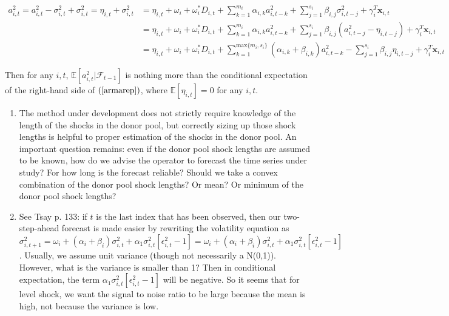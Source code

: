 \documentclass[11pt]{article}
\newcommand{\x}{\textbf{x}}
\def\E{\mathbb{E}} %
\theoremstyle{definition}
\begin{document}
\begin{align}
a^{2}_{i,t} = a^{2}_{i,t} - \sigma^{2}_{i,t} + \sigma^{2}_{i,t} = \eta_{i,t} + \sigma^{2}_{i,t} &= \eta_{i,t} + \omega_{i} + \omega^{*}_i D_{i,t}  + \sum^{m_{i}}_{k=1}\alpha_{i,k}a^{2}_{i,t-k} + \sum_{j=1}^{s_{i}}\beta_{i,j}\sigma_{i,t-j}^{2} + \gamma_{i}^{T} \x_{i,t} \\
    &= \eta_{i,t} + \omega_{i} + \omega^{*}_i D_{i,t}  + \sum^{m_{i}}_{k=1}\alpha_{i,k}a^{2}_{i,t-k}  + \sum_{j=1}^{s_{i}}\beta_{i,j}(a^{2}_{i,t-j} - \eta_{i,t-j}) + \gamma_{i}^{T} \x_{i,t} \\
    &= \eta_{i,t} + \omega_{i} + \omega^{*}_i D_{i,t}  + \sum^{\text{max}\{m_{i},s_{i}\}}_{k=1}(\alpha_{i,k} + \beta_{i,k})a^{2}_{i,t-k} - \sum_{j=1}^{s_{i}}\beta_{i,j}\eta_{i,t-j} + \gamma_{i}^{T} \x_{i,t}\label{armarep}
\end{align}

Then for any $i,t$, $\E[a^{2}_{i,t}|\mathcal{F}_{t-1}]$ is nothing more than the conditional expectation of the right-hand side of $(\ref{armarep})$, where $\E[\eta_{i,t}] = 0$ for any $i,t$.

\begin{enumerate}
\item The method under development does not strictly require knowledge of the length of the shocks in the donor pool, but correctly sizing up those shock lengths is helpful to proper estimation of the shocks in the donor pool.  An important question remains: even if the donor pool shock lengths are assumed to be known, how do we advise the operator to forecast the time series under study?  For how long is the forecast reliable?  Should we take a convex combination of the donor pool shock lengths?  Or mean? Or minimum of the donor pool shock lengths?

\item See Tsay p. 133: if $t$ is the last index that has been observed, then our two-step-ahead forecast is made easier by rewriting the volatility equation as $\sigma^{2}_{i,t+1} = \omega_{i} + (\alpha_{i} + \beta_{i})\sigma^{2}_{i,t} + \alpha_{1}\sigma^{2}_{i,t}[\epsilon^{2}_{i,t} - 1]= \omega_{i} + (\alpha_{i} + \beta_{i})\sigma^{2}_{i,t} + \alpha_{1}\sigma^{2}_{i,t}[\epsilon^{2}_{i,t} - 1] $.  Usually, we assume unit variance (though not necessarily a N(0,1)).  However, what is the variance is smaller than 1?  Then in conditional expectation, the term $\alpha_{1}\sigma^{2}_{i,t}[\epsilon^{2}_{i,t} - 1]$ will be negative.  So it seems that for level shock, we want the signal to noise ratio to be large because the mean is high, not because the variance is low.
\end{enumerate}
\end{document}
